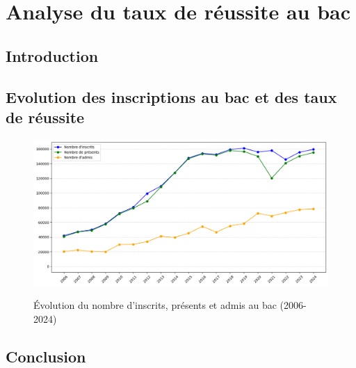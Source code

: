 \chapter{Analyse du taux de réussite au bac}
\section{Introduction}

\section{Evolution des inscriptions au bac et des taux de réussite}

\begin{figure}[h]
\centering
\caption{Évolution du nombre d'inscrits, présents et admis au bac (2006-2024)}
\includegraphics[width=1\textwidth]{figure/candidat.png}
\label{fig:candiadat}
\end{figure}


\section{Conclusion}